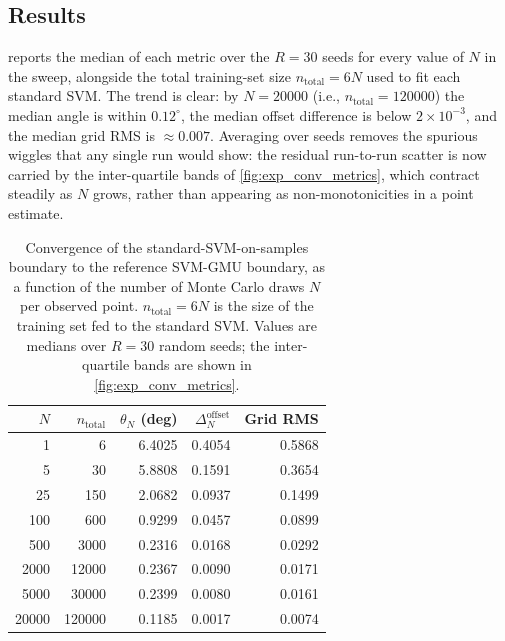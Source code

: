 \documentclass[11pt, letterpaper]{article}
\begin{document}
\subsection{Results}

 reports the median of each metric over the $R = 30$ seeds for every value of $N$ in the sweep, alongside the total training-set size $n_{\text{total}} = 6N$ used to fit each standard SVM. The trend is clear: by $N = 20000$ (i.e., $n_{\text{total}} = 120000$) the median angle is within $0.12^{\circ}$, the median offset difference is below $2\times10^{-3}$, and the median grid RMS is $\approx 0.007$. Averaging over seeds removes the spurious wiggles that any single run would show: the residual run-to-run scatter is now carried by the inter-quartile bands of \cref{fig:exp_conv_metrics}, which contract steadily as $N$ grows, rather than appearing as non-monotonicities in a point estimate.

\begin{table}[H]
    \centering
    \caption{Convergence of the standard-SVM-on-samples boundary to the reference SVM-GMU boundary, as a function of the number of Monte Carlo draws $N$ per observed point. $n_{\text{total}} = 6N$ is the size of the training set fed to the standard SVM. Values are medians over $R = 30$ random seeds; the inter-quartile bands are shown in \cref{fig:exp_conv_metrics}.}
    \label{tab:exp_conv_metrics}
    \begin{tabular}{@{}rrrrr@{}}
        \toprule
        $N$ & $n_{\text{total}}$ & $\theta_N$ (deg) & $\Delta_N^{\text{offset}}$ & Grid RMS \\
        \midrule
        1       & 6       & 6.4025 & 0.4054 & 0.5868 \\
        5       & 30      & 5.8808 & 0.1591 & 0.3654 \\
        25      & 150     & 2.0682 & 0.0937 & 0.1499 \\
        100     & 600     & 0.9299 & 0.0457 & 0.0899 \\
        500     & 3000    & 0.2316 & 0.0168 & 0.0292 \\
        2000    & 12000   & 0.2367 & 0.0090 & 0.0171 \\
        5000    & 30000   & 0.2399 & 0.0080 & 0.0161 \\
        20000   & 120000  & 0.1185 & 0.0017 & 0.0074 \\
        \bottomrule
    \end{tabular}
\end{table}
\end{document}
